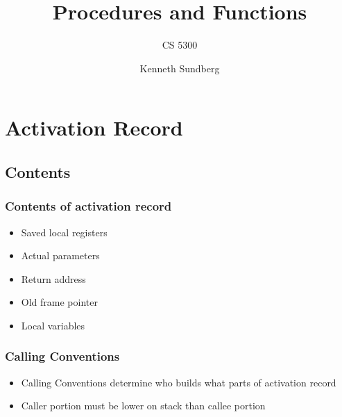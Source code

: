 \documentclass[usepdftitle=false,professionalfonts,compress ]{beamer}
\title{Procedures and Functions}
\subtitle{CS 5300}
\author{Kenneth Sundberg}
\date{}
\begin{document}
\frame[plain]{
	\frametitle{}
	\titlepage
	\vspace{-0.5cm}
	\begin{center}
	\end{center}
}
\frame{
	\tableofcontents[hideallsubsections]
}
















\section{Activation Record}
		
\subsection{Contents}

{
\begin{frame}\frametitle{Contents of activation record}

	\begin{itemize}
	\item Saved local registers
			\item Actual parameters
			\item Return address
			\item Old frame pointer
			\item Local variables
				\end{itemize}

\end{frame}}







{
\begin{frame}\frametitle{Calling Conventions}

	\begin{itemize}
	\item Calling Conventions determine who builds what parts of activation record
			\item Caller portion must be lower on stack than callee portion
				\end{itemize}

\end{frame}}
\end{document}

